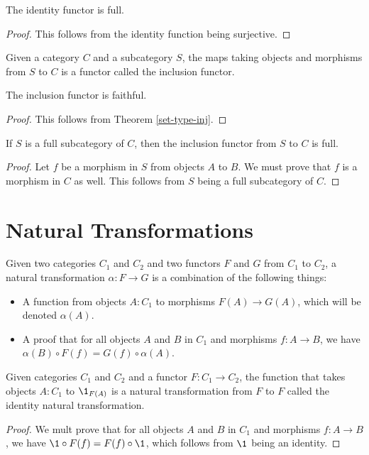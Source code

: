\documentclass[../math.tex]{subfiles}
\begin{document}
\begin{theorem}
    The identity functor is full.
\end{theorem}
\begin{proof}
    This follows from the identity function being surjective.
\end{proof}

\begin{definition}
    Given a category $C$ and a subcategory $S$, the maps taking objects and
    morphisms from $S$ to $C$ is a functor called the inclusion functor.
\end{definition}

\begin{theorem}
    The inclusion functor is faithful.
\end{theorem}
\begin{proof}
    This follows from Theorem \ref{set-type-inj}.
\end{proof}

\begin{theorem}
    If $S$ is a full subcategory of $C$, then the inclusion functor from $S$ to
    $C$ is full.
\end{theorem}
\begin{proof}
    Let $f$ be a morphism in $S$ from objects $A$ to $B$.  We must prove that
    $f$ is a morphism in $C$ as well.  This follows from $S$ being a full
    subcategory of $C$.
\end{proof}

\section{Natural Transformations}

\begin{definition}
    Given two categories $C_1$ and $C_2$ and two functors $F$ and $G$ from $C_1$
    to $C_2$, a natural transformation $\alpha : F \to G$ is a combination of
    the following things:
    \begin{itemize}
        \item A function from objects $A : C_1$ to morphisms $F(A) \to G(A)$,
            which will be denoted $\alpha(A)$.
        \item A proof that for all objects $A$ and $B$ in $C_1$ and morphisms $f
            : A \to B$, we have $\alpha(B) \circ F(f) = G(f) \circ \alpha(A)$.
    \end{itemize}
\end{definition}

\begin{theorem}
    Given categories $C_1$ and $C_2$ and a functor $F : C_1 \to C_2$, the
    function that takes objects $A : C_1$ to $\1_{F(A)}$ is a natural
    transformation from $F$ to $F$ called the identity natural transformation.
\end{theorem}
\begin{proof}
    We mult prove that for all objects $A$ and $B$ in $C_1$ and morphisms $f : A
    \to B$, we have $\1 \circ F(f) = F(f) \circ \1$, which follows from $\1$
    being an identity.
\end{proof}
\end{document}
